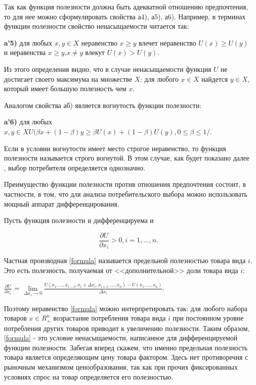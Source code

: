 \documentclass[12pt, 4paper]{book}
\begin{document}
{Так как функция полезности должна быть адекватной отношению предпочтения, то для нее можно сформулировать свойства а4), а5), а6). Например, в терминах функции полезности свойство ненасыщаемости читается так:

\textbf{a'5)} для любых $x,y \in X$ неравенство $x \geq y$ влечет неравенство $U(x) \geq U(y)$ и неравенства $x \geq y$,$x \neq y$ влекут $U(x) > U(y)$.

Из этого определения видно, что в случае ненасыщаемости функция $U$ не достигает своего максимума на множестве $X$: для любого $x \in X$ найдется $y \in X$, который имеет большую полезность чем $x$.

Аналогом свойства аб) является вогнутость функции полезности: 

\textbf{a'6)} для любых $x,y \in X U(\beta x + (1-\beta)y \geq \beta U(x)+(1-\beta)U(y), 0\leq \beta \leq 1/$.

Если в условии вогнутости имеет место строгое неравенство, то функция полезности называется строго вогнутой. В этом случае, как будет показано далее , выбор потребителя определяется однозначно.

Преимущество функции полезности против отношения предпочтения состоит, в частности, в том, что для анализа потребительского выбора можно использовать мощный аппарат дифференцирования. 

Пусть функция полезности и дифференцируема и 

\begin{equation}
\label{formula}
\frac{\partial U}{\partial x_{i}} > 0, i=1,...,n. 
\end{equation}

Частная производная \eqref{formula} называется предельной полезностью товара вида $i$. Это есть полезность, получаемая от <<дополнительной>> доли товара вида $i$: 
\begin{center}
 $\frac{\partial U}{\partial x_{i}}$ = $\lim\limits_{\Delta x_{i}\to 0} \frac{U(x_{1},...,x_{i-1},x_{i}+\Delta x_{i},x_{i+1},...,x_{n})-U(x_{1},...,x_{n})}{\Delta x_{i}}$.
\end{center}

Поэтому неравенство \eqref{formula} можно интерпретировать так: для любого набора товаров $x \in R_{+}^{n}$ возрастание потребления товара вида $i$ при постоянном уровне потребления других товаров приводит к увеличению полезности. Таким образом, \eqref{formula} - это условие ненасыщаемости, написанное для дифференцируемой функции полезности. Забегая вперед скажем, что именно предельная полезность товара является определяющим цену товара фактором. Здесь нет противоречия с рыночным механизмом ценообразования, так как при прочих фиксированных условиях спрос на товар определяется его полезностью.

}
\end{document}
